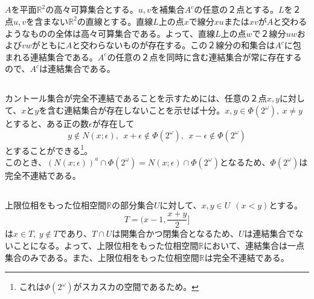 \documentclass{jsarticle}
\begin{document}
\subsection{}
$A$を平面$\mathbb{R}^2$の高々可算集合とする。$u,v$を補集合$A^c$の任意の２点とする。$L$を２点$u,v$を含まない$\mathbb{R}^2$の直線とする。直線$L$上の点$x$で線分$xu$または$xv$が$A$と交わるようなものの全体は高々可算集合である。よって、直線$L$上の点$w$で２線分$uw$および$vw$がともに$A$と交わらないものが存在する。この２線分の和集合は$A^c$に包まれる連結集合である。$A^c$の任意の２点を同時に含む連結集合が常に存在するので、$A^c$は連結集合である。



\subsection{}
カントール集合が完全不連結であることを示すためには、任意の２点$x,y$に対して、$x$と$y$を含む連結集合が存在しないことを示せば十分。$x,y\in\Phi(2^\omega),\ x\neq y$とすると、ある正の数$\epsilon$が存在して
\[y\notin N(x;\epsilon),\ \ x+\epsilon\notin\Phi(2^\omega),\ \ x-\epsilon\notin\Phi(2^\omega)\]
とすることができる\footnote{これは$\Phi(2^\omega)$がスカスカの空間であるため。}。\\
このとき、$(N(x;\epsilon))^a\cap\Phi(2^\omega)=N(x;\epsilon)\cap\Phi(2^\omega)$となるため、$\Phi(2^\omega)$は完全不連結である。


\subsection{}
上限位相をもった位相空間$\mathbb{R}$の部分集合$U$に対して、$x,y\in U \ \ (x< y)$とする。
\[T=(x-1,\frac{x+y}{2}]\]
は$x\in T,\ y\notin T$であり、$T\cap U$は開集合かつ閉集合となるため、$U$は連結集合でないことになる。よって、上限位相をもった位相空間$\mathbb{R}$において、連結集合は一点集合のみである。また、上限位相をもった位相空間$\mathbb{R}$は完全不連結である。
\end{document}
